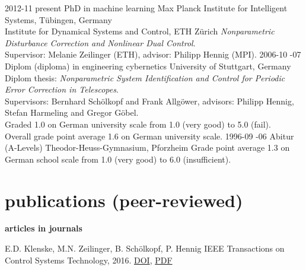 \documentclass[a4paper]{k-cv} %
\begin{document}
\begin{entrylist}
\entry
{2012-11 \to present}
{PhD {\normalfont in machine learning}}
{Max Planck Institute for Intelligent Systems, T\"ubingen, Germany\\
\phantom{x} \hfill Institute for Dynamical Systems and Control, ETH
Z{\"u}rich}
{\emph{Nonparametric Disturbance Correction and Nonlinear Dual Control}.\\
Supervisor: Melanie Zeilinger (ETH), \mbox{advisor}: Philipp Hennig (MPI).}
\entry
{2006-10 -07}
{Diplom {(diploma) \normalfont in engineering cybernetics}}
{University of Stuttgart, Germany}
{Diplom thesis: \emph{Nonparametric System Identification and Control for
Periodic Error Correction in Telescopes}.\\
Supervisors: Bernhard Sch\"olkopf and Frank Allg\"ower, advisors: Philipp
Hennig, Stefan Harmeling and Gregor G\"obel. \\
Graded 1.0 on German university scale from 1.0 (very
good) to 5.0 (fail).\\
Overall grade point average 1.6 on German university
scale.}
\entry
{1996-09 -06}
{Abitur (A-Levels)}
{Theodor-Heuss-Gymnasium, Pforzheim}
{Grade point average 1.3 on German school scale from 1.0 (very good) to 6.0
\mbox{(insufficient)}.}
\end{entrylist}


\section{publications (peer-reviewed)}

{\Large \bfseries articles in journals}


{E.D. Klenske, M.N. Zeilinger, B. Sch\"olkopf, P. Hennig}
{IEEE Transactions on Control Systems Technology, 2016.
\href{http://dx.doi.org/10.1109/TCST.2015.2420629}{\to DOI},
\href{https://is.tue.mpg.de/uploads_file/attachment/attachment/9/%
Klenske_tcst__1_.pdf}{\to PDF}
}
\end{document}
